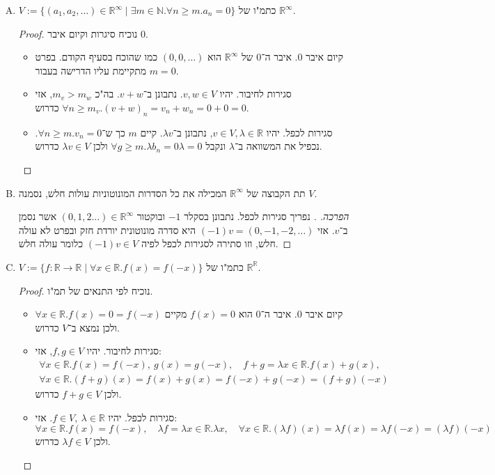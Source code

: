 \documentclass[]{article}
\newcommand\N     {\mathbb{N}}
\newcommand\R     {\mathbb{R}}
\renewcommand\inf {\infty}
\newcommand\co        {\colon}
\renewcommand\lg      {\lambda}
\begin{document}
\begin{enumerate}[A)]
		\item $V := \{(a_1, a_2, \dots) \in \R^{\inf} \mid \exists m \in \N. \forall n \ge m. a_n = 0\}$ כתמ"ו של $\R^{\inf}$. \begin{proof}
			נוכיח סיגרות וקיום איבר $0$. 
			\begin{itemize}
				\item קיום איבר $0$. איבר ה־$0$ של $\R^{\inf}$ הוא $(0, 0, \dots)$ כמו שהוכח בסעיף הקודם. בפרט מתקיימת עליו הדרישה בעבור $m = 0$. 
				\item סגירות לחיבור. יהיו $v, w \in V$. נתבונן ב־$v + w$. בה"כ $m_v > m_w$, אזי $\forall n \ge m_v. (v + w)_n = v_n + w_n = 0 + 0 = 0$ כדרוש. 
				\item סגירות לכפל. יהיו $v \in V, \lg \in \R$, נתבונן ב־$\lg v$. קיים $m$ כך ש־$\forall n \ge m. v_n =0$. נכפיל את המשוואה ב־$\lg$ ונקבל $\forall g \ge m. \lg b_n = 0 \lg = 0$ ולכן $\lg v \in V$ כדרוש. 
			\end{itemize}
		\end{proof}
		
		\item תת הקבוצה של $\R^{\inf}$ המכילה את כל הסדרות המונוטוניות עולות חלש, נסמנה $V$. \begin{proof}[הפרכה. ]
			נפריך סגירות לכפל. נתבונן בסקלר $-1$ ובוקטור $(0, 1, 2 \dots) \in \R^{\inf}$ אשר נסמן ב־$v$. אזי $(-1)v = (0, -1, -2, \dots)$ היא סדרה מונוטונית יורדת חזק ובפרט לא עולה חלש, וזו סתירה לסגירות לכפל לפיה $(-1)v \in V$ כלומר עולה חלש. 
		\end{proof}
		\item $V := \{f \co \R\to \R\mid \forall x \in \R. f(x) = f(-x)\}$ כתמ"ו של $\R^{\R}$. 
		\begin{proof}
			נוכיח לפי התנאים של תמ"ו. 
			\begin{itemize}
				\item קיום איבר $0$. איבר ה־$0$ הוא $f(x) = 0$ מקיים $\forall x \in \R. f(x) = 0 = f(-x)$ ולכן נמצא ב־$V$ כדרוש. 
				\item סגירות לחיבור. יהיו $f, g \in V$, אזי: 
				\begin{gather*}
					\forall x \in \R. f(x) = f(-x), \ g(x) = g(-x),  \quad f + g = \lambda x \in \R. f(x) + g(x), \\ \forall x \in \R. (f + g)(x) = f(x) + g(x) = f(-x) + g(-x) = (f + g)(-x)
				\end{gather*}
				ולכן $f + g \in V$ כדרוש. 
				\item סגירות לכפל. יהיו $f \in V, \ \lg \in \R$. אזי: 
				\[ \forall x \in \R. f(x) = f(-x), \quad \lg f = \lambda x \in \R. \lg x, \quad \forall x \in \R. (\lg f)(x) = \lg f(x) = \lg f(-x) = (\lg f)(-x) \]
				ולכן $\lg f \in V$ כדרוש. 
			\end{itemize}
		\end{proof}
		
	\end{enumerate}
	
\end{document}

